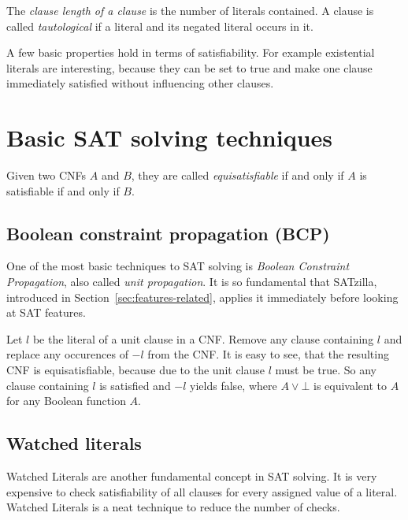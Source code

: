 \begin{defi}
  The \emph{clause length of a clause} is the number of literals contained.
  A clause is called \emph{tautological} if a literal and its negated literal occurs in it.
\end{defi}

A few basic properties hold in terms of satisfiability. For example existential literals
are interesting, because they can be set to true and make one clause immediately satisfied
without influencing other clauses.

\section{Basic SAT solving techniques}
\label{sec:sat-solving}
%
\begin{defi}
  Given two CNFs $A$ and $B$, they are called \emph{equisatisfiable} if and only
  if $A$ is satisfiable if and only if $B$.
\end{defi}

\subsection{Boolean constraint propagation (BCP)}
\label{sec:sat-bcp}
%
One of the most basic techniques to SAT solving is \emph{Boolean Constraint Propagation},
also called \emph{unit propagation}.
It is so fundamental that SATzilla, introduced in Section~\ref{sec:features-related},
applies it immediately before looking at SAT features.

Let $l$ be the literal of a unit clause in a CNF. Remove any clause containing
$l$ and replace any occurences of $-l$ from the CNF. It is easy to see, that
the resulting CNF is equisatisfiable, because due to the unit clause $l$ must
be true. So any clause containing $l$ is satisfied and $-l$ yields false,
where $A \lor \bot$ is equivalent to $A$ for any Boolean function $A$.

\subsection{Watched literals}
\label{sec:sat-wl}
%
Watched Literals are another fundamental concept in SAT solving. It is very
expensive to check satisfiability of all clauses for every assigned value
of a literal. Watched Literals is a neat technique to reduce the number of checks.

